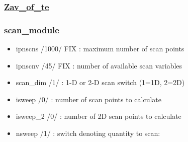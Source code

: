 \documentclass[]{article}
\providecommand{\tightlist}{%
  \setlength{\itemsep}{0pt}\setlength{\parskip}{0pt}}
\begin{document}
\subsubsection{\texorpdfstring{\href{Zav_of_te.html}{Zav\_of\_te}}{Zav\_of\_te}}\label{zav_of_te}

\subsubsection{\texorpdfstring{\href{scan_module.html}{scan\_module}}{scan\_module}}\label{scan_module}

\begin{itemize}
\tightlist
\item
  ipnscns /1000/ FIX : maximum number of scan points
\item
  ipnscnv /45/ FIX : number of available scan variables
\item
  scan\_dim /1/ : 1-D or 2-D scan switch (1=1D, 2=2D)
\item
  isweep /0/ : number of scan points to calculate
\item
  isweep\_2 /0/ : number of 2D scan points to calculate
\item
  nsweep /1/ : switch denoting quantity to scan:


\end{itemize}
\end{document}
